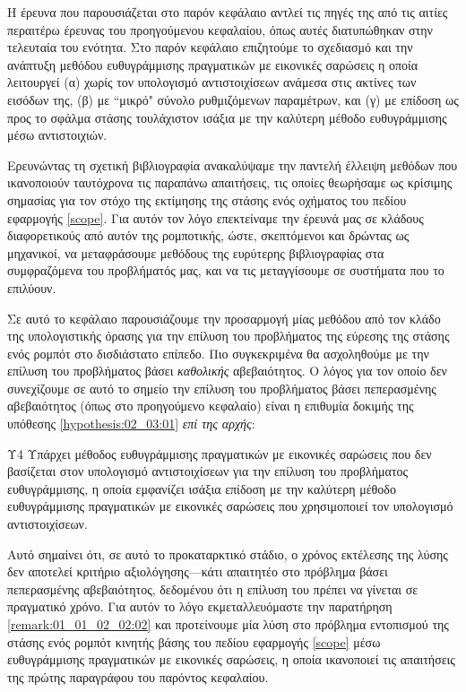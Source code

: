 Η έρευνα που παρουσιάζεται στο παρόν κεφάλαιο αντλεί τις πηγές της από τις
αιτίες περαιτέρω έρευνας του προηγούμενου κεφαλαίου, όπως αυτές διατυπώθηκαν
στην τελευταία του ενότητα. Στο παρόν κεφάλαιο επιζητούμε το σχεδιασμό και
την ανάπτυξη μεθόδου ευθυγράμμισης πραγματικών με εικονικές σαρώσεις η οποία
λειτουργεί (α) χωρίς τον υπολογισμό αντιστοιχίσεων ανάμεσα στις ακτίνες των
εισόδων της, (β) με ``μικρό" σύνολο ρυθμιζόμενων παραμέτρων, και (γ) με
επίδοση ως προς το σφάλμα στάσης τουλάχιστον ισάξια με την καλύτερη μέθοδο
ευθυγράμμισης μέσω αντιστοιχιών.

Ερευνώντας τη σχετική βιβλιογραφία ανακαλύψαμε την παντελή έλλειψη μεθόδων που
ικανοποιούν ταυτόχρονα τις παραπάνω απαιτήσεις, τις οποίες θεωρήσαμε ως
κρίσιμης σημασίας για τον στόχο της εκτίμησης της στάσης ενός οχήματος του
πεδίου εφαρμογής \ref{scope}. Για αυτόν τον λόγο επεκτείναμε την έρευνά μας σε
κλάδους διαφορετικούς από αυτόν της ρομποτικής, ώστε, σκεπτόμενοι και δρώντας
ως μηχανικοί, να μεταφράσουμε μεθόδους της ευρύτερης βιβλιογραφίας στα
συμφραζόμενα του προβλήματός μας, και να τις μεταγγίσουμε σε συστήματα που το
επιλύουν.

Σε αυτό το κεφάλαιο παρουσιάζουμε την προσαρμογή μίας μεθόδου από τον κλάδο της
υπολογιστικής όρασης για την επίλυση του προβλήματος της εύρεσης της στάσης
ενός ρομπότ στο δισδιάστατο επίπεδο. Πιο συγκεκριμένα θα ασχοληθούμε με την
επίλυση του προβλήματος βάσει \textit{καθολικής} αβεβαιότητος. Ο λόγος για τον
οποίο δεν συνεχίζουμε σε αυτό το σημείο την επίλυση του προβλήματος βάσει
πεπερασμένης αβεβαιότητος (όπως στο προηγούμενο κεφαλαίο) είναι η επιθυμία
δοκιμής της υπόθεσης \ref{hypothesis:02_03:01} \textit{επί της αρχής}:

\begin{customhypothesis}{Υ4}
\label{hypothesis:02_03:01}
  Υπάρχει μέθοδος ευθυγράμμισης πραγματικών με εικονικές σαρώσεις που δεν
  βασίζεται στον υπολογισμό αντιστοιχίσεων για την επίλυση του προβλήματος
  ευθυγράμμισης, η οποία εμφανίζει ισάξια επίδοση με την καλύτερη μέθοδο
  ευθυγράμμισης πραγματικών με εικονικές σαρώσεις που χρησιμοποιεί τον
  υπολογισμό αντιστοιχίσεων.
\end{customhypothesis}

Αυτό σημαίνει ότι, σε αυτό το προκαταρκτικό στάδιο, ο χρόνος εκτέλεσης της
λύσης δεν αποτελεί κριτήριο αξιολόγησης---κάτι απαιτητέο στο πρόβλημα βάσει
πεπερασμένης αβεβαιότητος, δεδομένου ότι η επίλυση του πρέπει να γίνεται σε
πραγματικό χρόνο. Για αυτόν το λόγο εκμεταλλευόμαστε την παρατήρηση
\ref{remark:01_01_02_02:02} και προτείνουμε μία λύση στο πρόβλημα εντοπισμού
της στάσης ενός ρομπότ κινητής βάσης του πεδίου εφαρμογής \ref{scope} μέσω
ευθυγράμμισης πραγματικών με εικονικές σαρώσεις, η οποία ικανοποιεί τις
απαιτήσεις της πρώτης παραγράφου του παρόντος κεφαλαίου.

